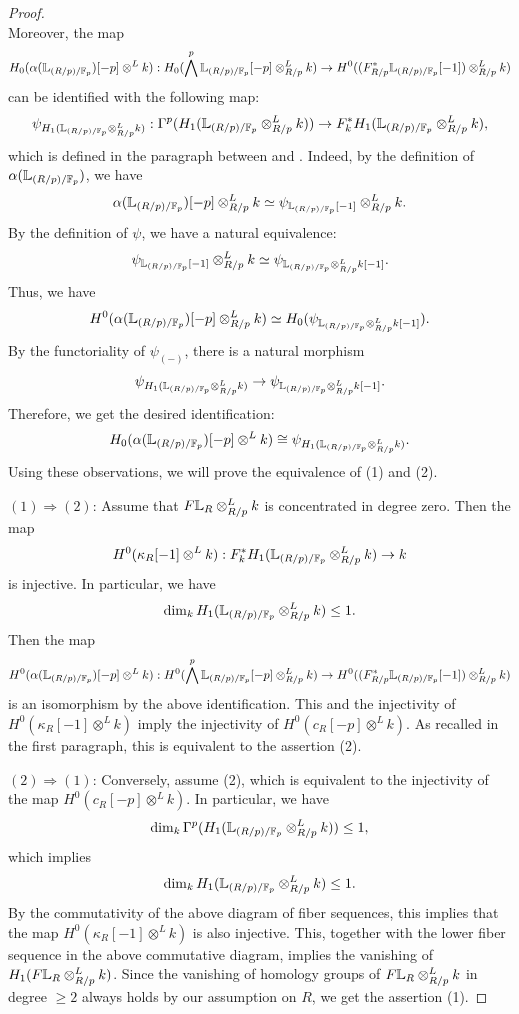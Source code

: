 \documentclass[11pt,a4paper]{amsart}
\begin{document}
\begin{proof}
\begin{equation*}
\end{equation*}
Moreover, the map
\[H_0(\alpha(\mathbb{L}_{(R/p)/\mathbb{F}_p})[-p]\otimes^L k): H_0(\bigwedge^p\mathbb{L}_{(R/p)/\mathbb{F}_p}[-p]\otimes^L_{R/p}k)\to H^0((F^*_{R/p}\mathbb{L}_{(R/p)/\mathbb{F}_p}[-1])\otimes^L_{R/p}k)\] can be identified with the following map:
\[\psi_{H_1(\mathbb{L}_{(R/p)/\mathbb{F}_p}\otimes^L_{R/p}k)}:\Gamma^p(H_1(\mathbb{L}_{(R/p)/\mathbb{F}_p}\otimes^L_{R/p}k))\to F^*_kH_1(\mathbb{L}_{(R/p)/\mathbb{F}_p}\otimes_{R/p}^Lk),\] which is defined in the paragraph between \cite[Lemma 2.5]{petrov2025Nondecomposability} and \cite[Lemma 2.6]{petrov2025Nondecomposability}. Indeed, by the definition of $\alpha(\mathbb{L}_{(R/p)/\mathbb{F}_p})$, we have 
\[\alpha(\mathbb{L}_{(R/p)/\mathbb{F}_p})[-p]\otimes_{R/p}^Lk\simeq \psi_{\mathbb{L}_{(R/p)/\mathbb{F}_p}[-1]}\otimes_{R/p}^Lk.\]
By the definition of $\psi$, we have a natural equivalence:
\[\psi_{\mathbb{L}_{(R/p)/\mathbb{F}_p}[-1]}\otimes^L_{R/p}k\simeq \psi_{\mathbb{L}_{(R/p)/\mathbb{F}_p}\otimes^L_{R/p}k[-1]}.\] Thus, we have 
\[H^0(\alpha(\mathbb{L}_{(R/p)/\mathbb{F}_p})[-p]\otimes_{R/p}^Lk)\simeq H_0(\psi_{\mathbb{L}_{(R/p)/\mathbb{F}_p}\otimes^L_{R/p}k[-1]}).\] By the functoriality of $\psi_{(-)}$, there is a natural morphism \[\psi_{H_1(\mathbb{L}_{(R/p)/\mathbb{F}_p}\otimes^L_{R/p}k)}\to \psi_{\mathbb{L}_{(R/p)/\mathbb{F}_p}\otimes^L_{R/p}k[-1]}.\] Therefore, we get the desired identification:
\[H_0(\alpha(\mathbb{L}_{(R/p)/\mathbb{F}_p})[-p]\otimes^L k)\cong \psi_{H_1(\mathbb{L}_{(R/p)/\mathbb{F}_p}\otimes^L_{R/p}k)}.\]
Using these observations, we will prove the equivalence of (1) and (2).

$(1)\Rightarrow (2)$: Assume that $F\mathbb{L}_R\otimes_{R/p}^Lk$ is concentrated in degree zero. Then the map
\[H^0(\kappa_R[-1]\otimes^L k):F^*_kH_1(\mathbb{L}_{(R/p)/\mathbb{F}_p}\otimes_{R/p}^Lk)\to k\] is injective. In particular, we have
\[\dim_kH_1(\mathbb{L}_{(R/p)/\mathbb{F}_p}\otimes_{R/p}^Lk)\le 1.\] Then the map
\[H^0(\alpha(\mathbb{L}_{(R/p)/\mathbb{F}_p})[-p]\otimes ^L k):H^0(\bigwedge^p\mathbb{L}_{(R/p)/\mathbb{F}_p}[-p]\otimes^L_{R/p}k)\to H^0((F^*_{R/p}\mathbb{L}_{(R/p)/\mathbb{F}_p}[-1])\otimes^L_{R/p}k)\] is an isomorphism by the above identification. This and the injectivity of $H^0(\kappa_R[-1]\otimes^L k)$ imply the injectivity of $H^0(c_R[-p]\otimes^Lk)$. As recalled in the first paragraph, this is equivalent to the assertion (2).

$(2)\Rightarrow (1)$: Conversely, assume (2), which is equivalent to the injectivity of the map $H^0(c_R[-p]\otimes^Lk)$. In particular, we have
\[\dim_k\Gamma^p(H_1(\mathbb{L}_{(R/p)/\mathbb{F}_p}\otimes^L_{R/p}k))\le 1,\] which implies 
\[\dim _kH_1(\mathbb{L}_{(R/p)/\mathbb{F}_p}\otimes^L_{R/p}k)\le 1.\]
By the commutativity of the above diagram of fiber sequences, this implies that the map $H^0(\kappa_R[-1]\otimes^Lk)$ is also injective. This, together with the lower fiber sequence in the above commutative diagram, implies the vanishing of $H_1(F\mathbb{L}_{R}\otimes_{R/p}^Lk)$. Since the vanishing of homology groups of $F\mathbb{L}_{R}\otimes_{R/p}^Lk$ in degree $\ge 2$ always holds by our assumption on $R$, we get the assertion (1).
\end{proof}
\end{document}
